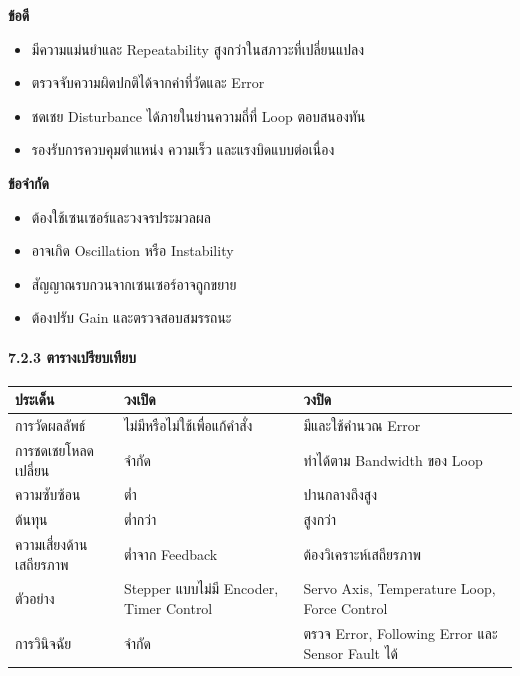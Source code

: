 \textbf{ข้อดี}

\begin{itemize}
    \item มีความแม่นยำและ Repeatability สูงกว่าในสภาวะที่เปลี่ยนแปลง
    \item ตรวจจับความผิดปกติได้จากค่าที่วัดและ Error
    \item ชดเชย Disturbance ได้ภายในย่านความถี่ที่ Loop ตอบสนองทัน
    \item รองรับการควบคุมตำแหน่ง ความเร็ว และแรงบิดแบบต่อเนื่อง
\end{itemize}

\textbf{ข้อจำกัด}

\begin{itemize}
    \item ต้องใช้เซนเซอร์และวงจรประมวลผล
    \item อาจเกิด Oscillation หรือ Instability
    \item สัญญาณรบกวนจากเซนเซอร์อาจถูกขยาย
    \item ต้องปรับ Gain และตรวจสอบสมรรถนะ
\end{itemize}

\paragraph{7.2.3 ตารางเปรียบเทียบ}

\begin{table}[htbp]
    \centering
    \begin{tabular}{l l l}
        \hline
        \textbf{ประเด็น} & \textbf{วงเปิด} & \textbf{วงปิด} \\
        \hline
        การวัดผลลัพธ์ & ไม่มีหรือไม่ใช้เพื่อแก้คำสั่ง & มีและใช้คำนวณ Error \\
        การชดเชยโหลดเปลี่ยน & จำกัด & ทำได้ตาม Bandwidth ของ Loop \\
        ความซับซ้อน & ต่ำ & ปานกลางถึงสูง \\
        ต้นทุน & ต่ำกว่า & สูงกว่า \\
        ความเสี่ยงด้านเสถียรภาพ & ต่ำจาก Feedback & ต้องวิเคราะห์เสถียรภาพ \\
        ตัวอย่าง & Stepper แบบไม่มี Encoder, Timer Control & Servo Axis, Temperature Loop, Force Control \\
        การวินิจฉัย & จำกัด & ตรวจ Error, Following Error และ Sensor Fault ได้ \\
        \hline
    \end{tabular}
\end{table}

